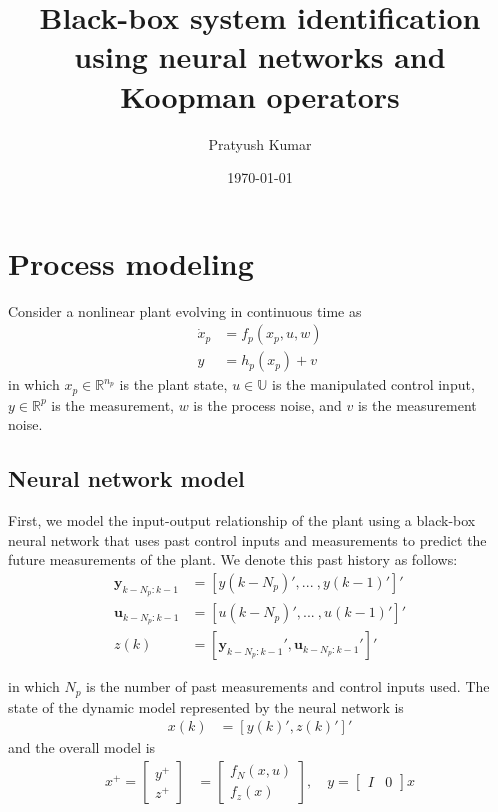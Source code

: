 \documentclass[10pt]{article}
\title{Black-box system identification using neural networks and Koopman operators}
\author{Pratyush Kumar}
\date{\today}
\newcommand{\bbR}{\mathbb{R}} \newcommand{\bbW}{\mathbb{W}}
\newcommand{\bbU}{\mathbb{U}} \newcommand{\bbI}{\mathbb{I}}
\begin{document}
\maketitle

\section{Process modeling}
Consider a nonlinear plant evolving in continuous time as
\begin{align*}
  \dot{x}_p &= f_p(x_p, u, w) \\
  y &= h_p(x_p) + v
\end{align*}
in which $x_p \in \bbR^{n_p}$ is the plant state, $u \in \bbU$ is the
manipulated control input, $y \in \bbR^p$ is the measurement, $w$ is the process
noise, and $v$ is the measurement noise.

\subsection{Neural network model}
First, we model the input-output relationship of the plant using a black-box
neural network that uses past control inputs and measurements to predict the
future measurements of the plant. We denote this past history as follows:
\begin{align*}
  \mathbf{y}_{k-N_p:k-1} &= [y(k-N_p)', ... \ , y(k-1)']' \\
  \mathbf{u}_{k-N_p:k-1} &= [u(k-N_p)', ... \ , u(k-1)']' \\
  z(k) &= [\mathbf{y}_{k-N_p:k-1}', \mathbf{u}_{k-N_p:k-1}']'
\end{align*}

in which $N_p$ is the number of past measurements and control inputs used. The
state of the dynamic model represented by the neural network is 
\begin{align*}
  x(k) &= [y(k)', z(k)']'
\end{align*}
and the overall model is
\begin{align*}
  x^+ = \begin{bmatrix}
    y^+ \\
    z^+
  \end{bmatrix} &= \begin{bmatrix}
    f_N(x, u) \\
    f_z(x)
  \end{bmatrix}, \quad y = \begin{bmatrix}
    I & 0
  \end{bmatrix}x
\end{align*}
\end{document}

